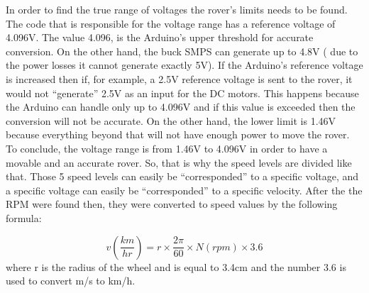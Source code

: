 \documentclass[a4paper]{article}
\begin{document}
In order to find the true range of voltages the rover's limits needs to be found. 
The code that is responsible for the voltage range has a reference voltage of 
4.096V. The value 4.096, is the Arduino's upper threshold for accurate 
conversion. On the other hand, the buck SMPS can generate up to 4.8V 
( due to the power losses it cannot generate exactly 5V). If the Arduino's 
reference voltage is increased then if, for example, a 2.5V reference voltage 
is sent to the rover, it  would not ``generate'' 2.5V as an input for the 
DC motors. This happens because the Arduino can handle only up to 4.096V and 
if this value is exceeded then the conversion will not be accurate. On the other 
hand, the lower limit is 1.46V because everything beyond that will not have enough 
power to move the rover. To conclude, the voltage range is from 1.46V to 4.096V in 
order to have a movable and an accurate rover. So, that is why the speed levels 
are divided like that. Those 5 speed levels can easily be ``corresponded'' to a 
specific voltage, and a specific voltage can easily be ``corresponded'' to a 
specific velocity.  After the the RPM were found then, they were converted to 
speed values by the following formula:

$$ v \left(\frac{km}{hr}\right) = r \times \frac{2\pi}{60} \times N \left( rpm \right) \times 3.6  $$
where r is the radius of the wheel and is equal to 3.4cm and the number 3.6 is used to convert m/s to km/h. 



\end{document}
